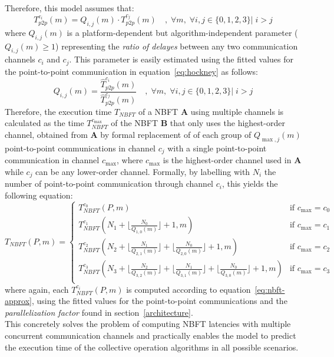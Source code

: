 \documentclass[../main.tex]{subfiles}
\begin{document}
Therefore, this model assumes that:
\begin{equation}\label{eq:q-factor}
    T^{c_{i}}_{p2p}(m) = Q_{i,j}(m) \cdot T^{c_{j}}_{p2p}(m) \quad ,\; \forall m,\; \forall i,j \in \{0,1,2,3\} | \; i > j
\end{equation}
where $Q_{i,j}(m)$ is a platform-dependent but algorithm-independent parameter ($Q_{i,j}(m) \geq 1$) representing the \textit{ratio of delayes} between any two communication channels $c_i$ and $c_j$. This parameter is easily estimated using the fitted values for the point-to-point communication in equation~\ref{eq:hockney} as follows:
\begin{equation}\label{eq:q-factor-estimate}
    Q_{i,j}(m) = \frac{\widehat{T}^{c_{i}}_{p2p}(m)}{\widehat{T}^{c_{j}}_{p2p}(m)} \quad ,\; \forall m,\; \forall i,j \in \{0,1,2,3\} | \; i > j
\end{equation}
Therefore, the execution time $T_{NBFT}$ of a NBFT $\mathbf{A}$ using multiple channels is calculated as the time $T^{c_{\max}}_{NBFT}$ of the NBFT $\mathbf{B}$ that only uses the highest-order channel, obtained from $\mathbf{A}$ by formal replacement of of each group of $Q_{\max,j}(m)$ point-to-point communications in channel $c_j$ with a single point-to-point communication in channel $c_{\max}$, where $c_{\max}$ is the highest-order channel used in $\mathbf{A}$ while $c_j$ can be any lower-order channel. Formally, by labelling with $N_i$ the number of point-to-point communication through channel $c_i$, this yields the following equation:
\begin{equation}\label{eq:nbft-multi}
    T_{NBFT}(P,m) =
    \begin{cases}
        T^{c_0}_{NBFT}(P,m) & \text{if } c_{\max} = c_0 \\
        T^{c_1}_{NBFT}(N_1 + \lfloor \frac{N_0}{Q_{1,0}(m)} \rfloor+1,m) & \text{if } c_{\max} = c_1 \\
        T^{c_2}_{NBFT}(N_2 + \lfloor \frac{N_1}{Q_{2,1}(m)} \rfloor+ \lfloor \frac{N_0}{Q_{2,0}(m)} \rfloor+1,m) & \text{if } c_{\max} = c_2 \\
        T^{c_3}_{NBFT}(N_3 + \lfloor \frac{N_2}{Q_{3,2}(m)} \rfloor+ \lfloor \frac{N_1}{Q_{3,1}(m)} \rfloor+ \lfloor \frac{N_0}{Q_{3,0}(m)} \rfloor+1,m) & \text{if } c_{\max} = c_3 \\
    \end{cases}
\end{equation}
where again, each $T^{c_i}_{NBFT}(P,m)$ is computed according to equation~\ref{eq:nbft-approx}, using the fitted values for the point-to-point communications and the \textit{parallelization factor} found in section~\ref{architecture}.\\
This concretely solves the problem of computing NBFT latencies with multiple concurrent communication channels and practically enables the model to predict the execution time of the collective operation algorithms in all possible scenarios.\\
\end{document}
